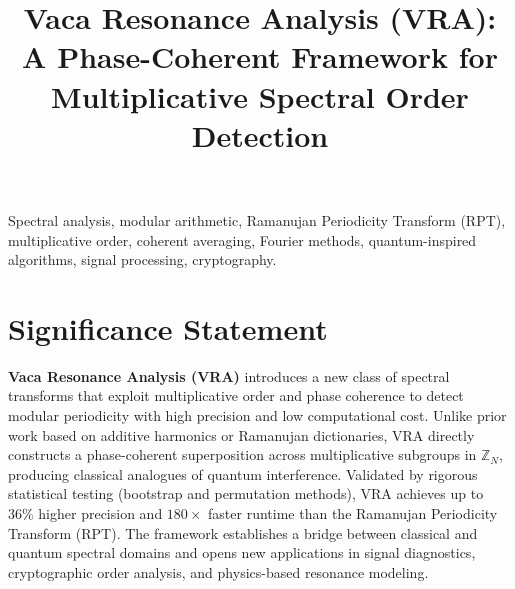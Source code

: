 \documentclass[conference]{IEEEtran}
\title{Vaca Resonance Analysis (VRA):\\
A Phase-Coherent Framework for Multiplicative Spectral Order Detection}
\author{
    \IEEEauthorblockN{Dylan Vaca}
    \IEEEauthorblockA{
        \textit{Independent Researcher, Computational Mathematics}\\
        \textit{Vaca Research Initiative}\\
        Email: dylan.vaca@provia.com
    }
}
\begin{document}
\maketitle

\begin{IEEEkeywords}
Spectral analysis, modular arithmetic, Ramanujan Periodicity Transform (RPT), multiplicative order, coherent averaging, Fourier methods, quantum-inspired algorithms, signal processing, cryptography.
\end{IEEEkeywords}


\section*{Significance Statement}
\textbf{Vaca Resonance Analysis (VRA)} introduces a new class of spectral transforms that exploit multiplicative order and phase coherence to detect modular periodicity with high precision and low computational cost.
Unlike prior work based on additive harmonics or Ramanujan dictionaries, VRA directly constructs a phase-coherent superposition across multiplicative subgroups in $\mathbb{Z}_N$, producing classical analogues of quantum interference.
Validated by rigorous statistical testing (bootstrap and permutation methods), VRA achieves up to $36\%$ higher precision and $180\times$ faster runtime than the Ramanujan Periodicity Transform (RPT).
The framework establishes a bridge between classical and quantum spectral domains and opens new applications in signal diagnostics, cryptographic order analysis, and physics-based resonance modeling.

\end{document}
